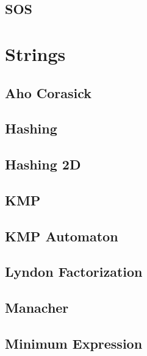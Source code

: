 \subsection{SOS}
\raggedbottom
\hrulefill

\section{Strings}
\subsection{Aho Corasick}
\raggedbottom
\hrulefill
\subsection{Hashing}
\raggedbottom
\hrulefill
\subsection{Hashing 2D}
\raggedbottom
\hrulefill
\subsection{KMP}
\raggedbottom
\hrulefill
\subsection{KMP Automaton}
\raggedbottom
\hrulefill
\subsection{Lyndon Factorization}
\raggedbottom
\hrulefill
\subsection{Manacher}
\raggedbottom
\hrulefill
\subsection{Minimum Expression}
\raggedbottom
\hrulefill
